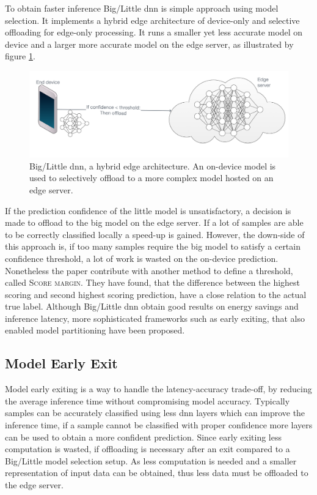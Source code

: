 To obtain faster inference Big/Little \gls{dnn} \cite{park_big/little_2015} is simple approach using model selection. It implements a hybrid edge architecture of device-only and selective offloading for edge-only processing. It runs a smaller yet less accurate model on device and a larger more accurate model on the edge server, as illustrated by figure \ref{fig:big/little-dnn}. 

\begin{figure}
	\centering
	\includegraphics[width=\linewidth]{figures/models/big_little_dnn}
	\caption[Big/Little \gls{dnn} architecture]{Big/Little \gls{dnn}, a hybrid edge architecture. An on-device model is used to selectively offload to a more complex model hosted on an edge server.}
	\label{fig:big/little-dnn}
\end{figure}

If the prediction confidence of the little model is unsatisfactory, a decision is made to offload to the big model on the edge server. If a lot of samples are able to be correctly classified locally a speed-up is gained. However, the down-side of this approach is, if too many samples require the big model to satisfy a certain confidence threshold, a lot of work is wasted on the on-device prediction. Nonetheless the paper \cite{park_big/little_2015} contribute with another method to define a threshold, called \textsc{Score margin}. They have found, that the difference between the highest scoring and second highest scoring prediction, have a close relation to the actual true label. Although Big/Little \gls{dnn} obtain good results on energy savings and inference latency, more sophisticated frameworks such as early exiting, that also enabled model partitioning have been proposed.

\subsection{Model Early Exit}

Model early exiting is a way to handle the latency-accuracy trade-off, by reducing the average inference time without compromising model accuracy. Typically samples can be accurately classified using less \gls{dnn} layers which can improve the inference time, if a sample cannot be classified with proper confidence more layers can be used to obtain a more confident prediction. Since early exiting less computation is wasted, if offloading is necessary after an exit compared to a Big/Little model selection setup. As less computation is needed and a smaller representation of input data can be obtained, thus less data must be offloaded to the edge server.

